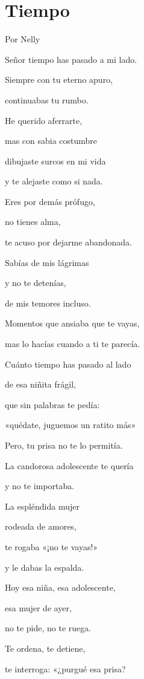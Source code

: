 \documentclass[11pt,twoside,openright,a5paper]{book}
\begin{document}
\section*{Tiempo}

                                                                                                            \begin{flushright}Por Nelly\end{flushright}
\begin{center}
Señor tiempo has pasado a mi lado.

Siempre con tu eterno apuro,

continuabas tu rumbo.
 
He querido aferrarte,

mas con sabia costumbre

dibujaste surcos en mi vida

y te alejaste como si nada.
 
Eres por demás prófugo, 

no tienes alma,

te acuso por dejarme abandonada.
 
Sabías de mis lágrimas

y no te detenías,

de  mis temores incluso.

Momentos que ansiaba que te vayas,

mas lo hacías cuando a ti te parecía.
 
Cuánto tiempo has pasado al lado

de esa niñita frágil,

que sin palabras te pedía:

«quédate, juguemos un ratito más»

Pero, tu prisa no te lo permitía.
 
La candorosa adolescente te quería

y no te importaba.

La espléndida mujer 

rodeada de amores,

te rogaba «¡no te vayas!»

y le dabas la espalda.

Hoy esa niña, esa adolescente,

esa mujer de ayer,

no te pide, no te ruega.

Te ordena, te detiene, 

te interroga: «¿purgué esa prisa?  


\end{center}
\end{document}
